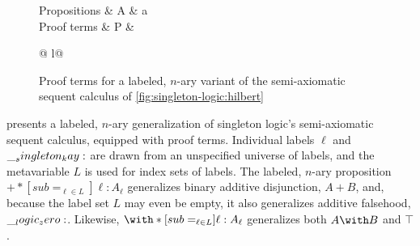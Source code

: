 \begin{figure}[tbp]
  \vspace*{\dimexpr-\abovedisplayskip-\abovecaptionskip\relax}
  \begin{syntax*}
    Propositions &
      A & a \mid {}
            \mid {}
    \\
    Proof terms &
      P &  \mid \fwd
          \begin{array}[t]{@{{} \mid {}}l@{}}
            \selectR{\kay} \mid {} \\
             \mid \selectL{\kay}
          \end{array}
  \end{syntax*}
  \vspace{-\belowdisplayskip}%
  \caption{Proof terms for a labeled, $n$-ary variant of the semi-axiomatic sequent calculus of \cref{fig:singleton-logic:hilbert}}%
  \label{fig:singleton-logic:hilbert-terms}
\end{figure}
%
 presents a labeled, $n$-ary generalization of singleton logic's semi-axiomatic sequent calculus, equipped with proof terms.
Individual labels $\ell$ and $\__singleton_kay:$ are drawn from an unspecified universe of labels, and the metavariable $L$ is used for index sets of labels.
The labeled, $n$-ary proposition $\plus*[sub=_{\ell \in L}]{\ell:A_{\ell}}$ generalizes binary additive disjunction, $A \plus B$, and, because the label set $L$ may even be empty, it also generalizes additive falsehood, $\__logic_zero:$.
Likewise, $\with*[sub=_{\ell \in L}]{\ell:A_{\ell}}$ generalizes both $A \with B$ and $\top$.

